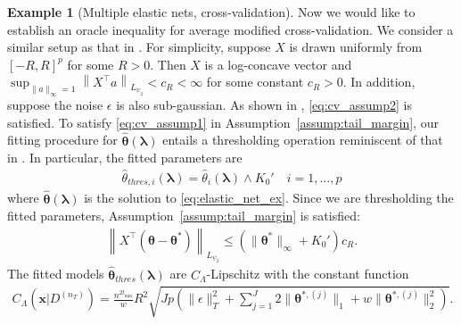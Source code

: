 \documentclass[12pt]{article} %
\theoremstyle{definition}
\newtheorem{example}{Example}
\begin{document}
\begin{example}[Multiple elastic nets, cross-validation]
	Now we would like to establish an oracle inequality for average modified cross-validation.
	We consider a similar setup as that in \citet{lecue2012oracle}.
	For simplicity, suppose $X$ is drawn uniformly from $[-R, R]^p$ for some $R > 0$.
	Then $X$ is a log-concave vector and
	$
	\sup_{\|a\|_\infty = 1} \left\| X^\top a \right \|_{L_{\psi_2}} < c_R < \infty
	$
	for some constant $c_R > 0$.
	In addition, suppose the noise $\epsilon$ is also sub-gaussian.
	As shown in \citet{lecue2012oracle}, \eqref{eq:cv_assump2} is satisfied.
	To satisfy \eqref{eq:cv_assump1} in Assumption~\ref{assump:tail_margin}, our fitting procedure for $\hat{\boldsymbol{\theta}}(\boldsymbol{\lambda})$ entails a thresholding operation reminiscent of that in \citet{lecue2012oracle}.
	In particular, the fitted parameters are
	\begin{align}
	\hat{{\theta}}_{thres, i}(\boldsymbol{\lambda})
	= \hat{{\theta}}_{i}(\boldsymbol{\lambda}) \wedge K_0'
	\quad i = 1,...,p
	\end{align}
	where $\hat{\boldsymbol{\theta}}(\boldsymbol{\lambda})$ is the solution to \eqref{eq:elastic_net_ex}.
	Since we are thresholding the fitted parameters, Assumption~\ref{assump:tail_margin} is satisfied:
	\begin{align}
	\left\|
	X^\top (\boldsymbol{\theta} - \boldsymbol{\theta}^*)
	\right \|_{L_{\psi_2}}
	\le
	(\|\boldsymbol{\theta}^*\|_\infty + K_0')
	c_R.
	\end{align}
	The fitted models $\hat{\boldsymbol{\theta}}_{thres}(\boldsymbol{\lambda})$ are $C_\Lambda$-Lipschitz with the constant function
	\begin{align}
	C_\Lambda(\boldsymbol{x} | D^{(n_T)})
	=
	\frac{n^{2t_{\min}}}{w}
	R^2 \sqrt{
		J p
		\left(
		\|\epsilon\|_{T}^{2}
		+\sum_{j=1}^J
		2 \|\boldsymbol{\theta}^{*,(j)}\|_1
		+ w\|\boldsymbol{\theta}^{*,(j)}\|_2^2
		\right)
	}.
	\label{eq:elastic_lipschitz_cv}
	\end{align}
	

\end{example}
\end{document}
